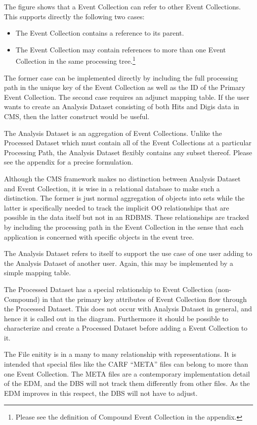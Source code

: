 \documentclass{cmspaper}
\begin{document}
The figure shows that a Event Collection can refer to other Event Collections.  This 
supports directly the following two cases: 
\begin{itemize}
\item The Event Collection contains a reference to its parent. 
\item The Event Collection may contain references to more than one 
Event Collection in the same processing tree.\footnote{Please see the definition of
Compound Event Collection in the appendix.}
\end{itemize}
The former case can be implemented directly by including the 
full processing path in the unique key of the Event Collection as well as the 
ID of the Primary Event Collection.  The second case requires an adjunct 
mapping table. 
If the user wants to create an Analysis Dataset consisting of both Hits and 
Digis data in CMS, then the latter construct would be useful.  

The Analysis Dataset is an aggregation of Event Collections.  Unlike the 
Processed Dataset which must contain all of the Event Collections at a 
particular Processing Path, the Analysis Dataset flexibly contains any subset
thereof.  Please see the appendix for a precise formulation.

Although the CMS framework makes no distinction between Analysis Dataset and Event Collection, 
it is wise in a relational database to make such a distinction.  The former is just normal aggregation
of objects into sets while the latter is specifically needed to track the implicit
OO relationships that are possible in the data itself
but not in an RDBMS. These relationships are tracked by including the processing path in the 
Event Collection in the sense that each application is concerned with specific objects in the 
event tree.  

The Analysis Dataset refers to itself to support
the use case of one user adding to the Analysis Dataset of another user.  Again, this
may be implemented by a simple mapping table.

The Processed Dataset has a special relationship to Event Collection (non-Compound) 
in that the primary key attributes 
of Event Collection flow through the Processed Dataset.  This does not occur 
with Analysis Dataset in general, and hence it is called out in the diagram.
Furthermore it should be possible to characterize and
create a Processed Dataset before adding a Event Collection to it.  

The File enitity is in a many to 
many relationship with representations.  It is intended that special files 
like the CARF ``META'' files can belong to more than one Event Collection.
The META files are a contemporary implementation detail of the EDM, 
and the DBS will not track them differently from other files.  
As the EDM improves in this 
respect, the DBS will not have to adjust.
\end{document}
